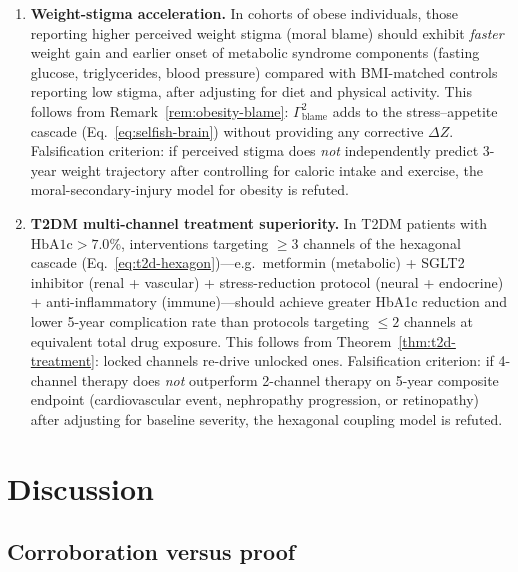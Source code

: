 \documentclass[aps,pre,twocolumn,superscriptaddress,floatfix]{revtex4-2}
\begin{document}
\begin{enumerate}
  \item \textbf{Weight-stigma acceleration.}
    In cohorts of obese individuals, those reporting
    higher perceived weight stigma (moral blame)
    should exhibit \emph{faster} weight gain and
    earlier onset of metabolic syndrome components
    (fasting glucose, triglycerides, blood pressure)
    compared with BMI-matched controls reporting
    low stigma, after adjusting for diet and
    physical activity.
    This follows from Remark~\ref{rem:obesity-blame}:
    $\Gamma^2_{\text{blame}}$ adds to the
    stress--appetite cascade
    (Eq.~\ref{eq:selfish-brain}) without providing
    any corrective $\Delta Z$.
    Falsification criterion: if perceived stigma
    does \emph{not} independently predict 3-year
    weight trajectory after controlling for
    caloric intake and exercise, the
    moral-secondary-injury model for obesity is
    refuted.

  \item \textbf{T2DM multi-channel treatment superiority.}
    In T2DM patients with $\mathrm{HbA1c} > 7.0$\%,
    interventions targeting $\geq 3$ channels of the
    hexagonal cascade
    (Eq.~\ref{eq:t2d-hexagon})---e.g.\
    metformin (metabolic) + SGLT2 inhibitor
    (renal + vascular) + stress-reduction protocol
    (neural + endocrine) + anti-inflammatory
    (immune)---should achieve greater HbA1c
    reduction and lower 5-year complication rate
    than protocols targeting $\leq 2$ channels
    at equivalent total drug exposure.
    This follows from Theorem~\ref{thm:t2d-treatment}:
    locked channels re-drive unlocked ones.
    Falsification criterion: if 4-channel therapy
    does \emph{not} outperform 2-channel therapy
    on 5-year composite endpoint (cardiovascular
    event, nephropathy progression, or retinopathy)
    after adjusting for baseline severity,
    the hexagonal coupling model is refuted.
\end{enumerate}


\section{Discussion}
\label{sec:discussion}

\subsection{Corroboration versus proof}
\end{document}
